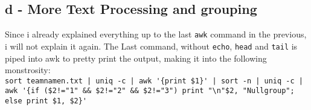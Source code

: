 \documentclass[a4paper, 11pt]{article}
\begin{document}
    \subsection{d - More Text Processing and grouping}
    Since i already explained everything up to the last \texttt{awk} command in the previous, i will not explain it again.
    The Last command, without \texttt{echo}, \texttt{head} and \texttt{tail} is piped into awk to pretty print the output, making it into the following monstrosity:\\
    \lstinline+sort teamnamen.txt | uniq -c | awk '{print $1}' | sort -n | uniq -c | awk '{if ($2!="1" && $2!="2" && $2!="3") print "\n"$2, "Nullgroup"; else print $1, $2}'+
\end{document}
